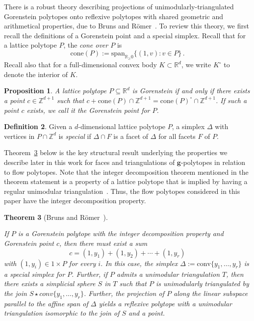 \documentclass[12pt]{amsart}
\newtheorem{theorem}{Theorem}[section]
\newtheorem{proposition}[theorem]{Proposition}
\theoremstyle{definition}
\newtheorem{definition}[theorem]{Definition}
\newcommand{\defn}[1]{\emph{\color{blue} #1}}
\newcommand\bg{\mathbf{g}}
\newcommand\R{\mathbb{R}}
\begin{document}
There is a robust theory describing projections of unimodularly-triangulated Gorenstein polytopes onto reflexive polytopes with shared geometric and arithmetical properties, due to Bruns and R\"omer~\cite{BrunsRomer}.
To review this theory, we first recall the definitions of a Gorenstein point and a special simplex.
Recall that for a lattice polytope $P$, the \defn{cone over $P$} is
\[
\mathrm{cone}(P):=\mathrm{span}_{\R_\geq 0}\{(1,v): v \in P\}\, .
\]
Recall also that for a full-dimensional convex body $K\subset \R^d$, we write $K^\circ$ to denote the interior of $K$.

\begin{proposition}
    A lattice polytope $P \subseteq \mathbb{R}^{d}$ is \defn{Gorenstein} if and only if there exists a point $c \in \mathbb{Z}^{d+1}$ such that $c + \mathrm{cone}(P) \cap \mathbb{Z}^{d+1}=\mathrm{cone}(P)^\circ \cap \mathbb{Z}^{d+1}$. 
    If such a point $c$ exists, we call it the \defn{Gorenstein point} for $P$.
\end{proposition}

\begin{definition}
    Given a $d$-dimensional lattice polytope $P$, a simplex $\Delta$ with vertices in $P \cap \mathbb{Z}^d$ is \defn{special} if $\Delta \cap F$ is a facet of $\Delta$ for all facets $F$ of $P$.
\end{definition}

Theorem~\ref{thm:brunsromer} below is the key structural result underlying the properties we describe later in this work for faces and triangulations of $\bg$-polytopes in relation to flow polytopes.
Note that the integer decomposition theorem mentioned in the theorem statement is a property of a lattice polytope that is implied by having a regular unimodular triangulation~\cite{unimodulartriangulationssurvey}.
Thus, the flow polytopes considered in this paper have the integer decomposition property.

\begin{theorem}[Bruns and R\"omer~\cite{BrunsRomer}]\label{thm:brunsromer}

If $P$ is a Gorenstein polytope with the integer decomposition property and Gorenstein point $c$, then there must exist a sum 
\[
c=(1,y_1)+(1,y_2)+\cdots+(1,y_r)
\]
with $(1,y_i) \in 1\times P$ for every $i$.
In this case, the simplex $\Delta:=\mathrm{conv}\{y_1,\ldots,y_r\}$ is a special simplex for $P$. 
Further, if $P$ admits a unimodular triangulation $T$, then there exists a simplicial sphere $S$ in $T$ such that $P$ is unimodularly triangulated by the join $S \star conv\{y_1,\ldots,y_r\}$.
Further, the projection of $P$ along the linear subspace parallel to the affine span of $\Delta$ yields a reflexive polytope with a unimodular triangulation isomorphic to the join of $S$ and a point.
\end{theorem}
\end{document}
